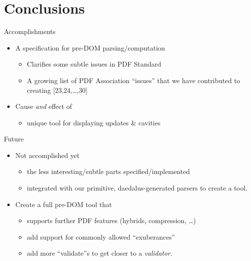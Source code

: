 \documentclass[t,10pt,xcolor={dvipsnames}]{beamer}
\begin{document}
\section{Conclusions}
\label{sec:org74c753c}
\begin{frame}[label={sec:org6669ae1}]{Accomplishments}
\begin{itemize}
\item A specification for pre-DOM parsing/computation
\begin{itemize}
\item Clarifies some subtle issues in PDF Standard
\item A growing list of PDF Association “issues” that we have contributed to
creating [23,24,\ldots{},30]
\end{itemize}
\item Cause \emph{and} effect of
\begin{itemize}
\item unique tool for displaying updates \& cavities
\end{itemize}
\end{itemize}
\end{frame}

\begin{frame}[label={sec:org2944a2b}]{Future}
\begin{itemize}
\item Not accomplished yet
\begin{itemize}
\item the less interesting/subtle parts specified/implemented
\item integrated with our primitive, daedalus-generated parsers to create
a  tool.
\end{itemize}

\item Create a full pre-DOM tool that
\begin{itemize}
\item supports further PDF features (hybrids, compression, …)
\item add support for commonly allowed “exuberances”
\item add more “validate”s to get closer to a \emph{validator}.
\end{itemize}
\end{itemize}
\end{frame}
\end{document}
